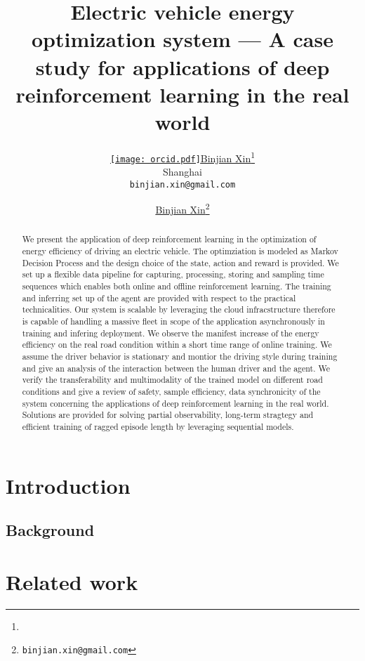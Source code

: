 \documentclass{article}
\title{Electric vehicle energy optimization system --- A case study for applications of deep reinforcement learning in the real world}
\author{ \href{https://orcid.org/0009-0003-0705-2612}{\texttt{[image: orcid.pdf]}\hspace{1mm}Binjian Xin}\thanks{} \\
	Shanghai\\
	\texttt{binjian.xin@gmail.com} \\
}
\author[1]{%
	\href{https://orcid.org/0009-0003-0705-2612}{\usebox{\orcid}\hspace{1mm}Binjian Xin\thanks{\texttt{binjian.xin@gmail.com}}}%
}
\affil[1]{}
\begin{document}
\maketitle

\begin{abstract}
  We present the application of deep reinforcement learning in the optimization of energy efficiency of driving an electric vehicle. The optimziation is modeled as Markov Decision Process and the design choice of the state, action and reward is provided. We set up a flexible data pipeline for capturing, processing, storing and sampling time sequences which enables both online and offline reinforcement learning. The training and inferring set up of the agent are provided with respect to the practical technicalities. Our system is scalable by leveraging the cloud infracstructure therefore is capable of handling a massive fleet in scope of the application asynchronously in training and infering deployment. We observe the manifest increase of the energy efficiency on the real road condition within a short time range of online training. We assume the driver behavior is stationary and montior the driving style during training and give an analysis of the interaction between the human driver and the agent. We verify the transferability and multimodality of the trained model on different road conditions and give a review of safety, sample efficiency, data synchronicity of the system concerning the applications of deep reinforcement learning in the real world. Solutions are provided for solving partial observability, long-term stragtegy and efficient training of ragged episode length by leveraging sequential models.
\end{abstract}



\section{Introduction}
\label{sec:intro}





\subsection{Background}
\label{sec:intro:background}

\section{Related work}
\label{sec:related}
\end{document}
